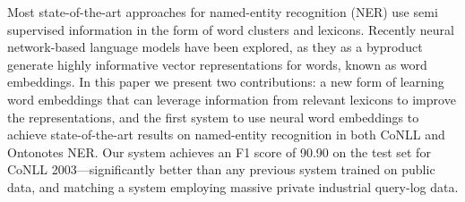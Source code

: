 Most state-of-the-art approaches for named-entity recognition (NER) use semi supervised information in the form of word clusters and lexicons. Recently neural network-based language models have been explored, as they as a byproduct generate highly informative vector representations for words, known as word embeddings. In this paper we present two contributions: a new form of learning word embeddings that can leverage information from relevant lexicons to improve the representations, and the first system to use neural word embeddings to achieve state-of-the-art results on named-entity recognition in both CoNLL and Ontonotes NER. Our system achieves an F1 score of 90.90 on the test set for CoNLL 2003---significantly better than any previous system trained on public data, and matching a system employing massive private industrial query-log data.
